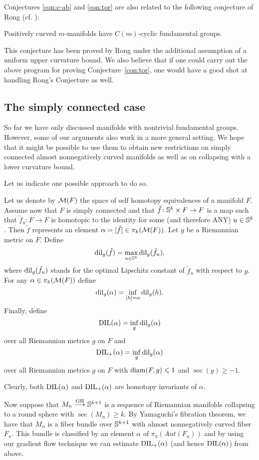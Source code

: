 \documentclass{amsart}
\begin{document}
Conjectures \ref{con:c-ab} and  \ref{con:tor} are also related to the following conjecture of Rong
(cf. \cite{Ro2,Ro1}):

\begin{conj}[Rong] \label{con:rong} Positively curved $m$-manifolds have
$C(m)$-cyclic fundamental groups.
\end{conj}

This conjecture has been proved by Rong \cite{Ro2} under the
additional assumption of a uniform upper curvature bound. We also
believe that if one could carry out the above program for proving
Conjecture~\ref{con:tor}, one would have a good shot at handling
Rong's Conjecture as well.

\subsection{The simply connected case}
So far we have only discussed manifolds with nontrivial fundamental groups.
However, some of our arguments  also work in a more general setting.
We hope that it might be possible  to use them to obtain new restrictions on simply connected almost nonnegatively curved manifolds as well as on collapsing with a lower curvature bound.

Let us indicate one possible approach to do so.

Let us denote by ${\mathcal M}(F)$ the space of self homotopy equivalences of a manifold $F$.
Assume now that $F$ is simply connected and that $\tilde f\colon {\Bbb S}^{k}\times F\to F$ is a map such that $\tilde f_u\colon F\to F$ is homotopic to the identity for some (and therefore ANY) $u\in {\Bbb S}^{k}$.
Then $\tilde f$ represents an element $\alpha=[\tilde f]\in \pi_{k}({\mathcal M}(F))$.
Let $g$ be a Riemannian metric on $F$.
Define
$$\operatorname{\rm dil}_g(\tilde f)=\max_{u\in {\Bbb S}^k}\operatorname{\rm dil}_g(\tilde f_u),$$
where  $\operatorname{\rm dil}_g(\tilde f_u)$ stands for the optimal Lipschitz constant of $\tilde f_u$ with respect to $g$.
For any $\alpha\in \pi_k({\mathcal M}(F))$ define
$$\operatorname{\rm dil}_g(\alpha)=\inf_{[h]=\alpha}\operatorname{\rm dil}_g(h).$$
Finally, define
$$\operatorname{\rm DIL}(\alpha)=\inf_g\operatorname{\rm dil}_g(\alpha)$$
over all Riemannian metrics $g$ on $F$ and
$$\operatorname{\rm DIL}_+(\alpha)=\inf_g\operatorname{\rm dil}_g(\alpha)$$
over all Riemannian metrics $g$ on $F$ with $\operatorname{\rm diam}(F,g)\leqslant 1$ and $\sec(g)\ge -1$.

Clearly, both $\operatorname{\rm DIL}(\alpha)$ and $\operatorname{\rm DIL}_+(\alpha)$ are  homotopy invariants of $\alpha$.



Now suppose that $M_n\GHto {\Bbb S}^{k+1}$ is a sequence of Riemannian manifolds collapsing to a round sphere with $\sec(M_n)\ge k$.
By Yamaguchi's fibration theorem, we have that $M_n$ is a fiber bundle over ${\Bbb S}^{k+1}$ with almost nonnegatively curved fiber $F_n$.
This bundle is classified by an element $\alpha$  of $\pi_k(Aut(F_n))$ and by using our gradient flow technique we can estimate $\operatorname{\rm DIL}_+(\alpha)$ (and hence $\operatorname{\rm DIL}(\alpha)$) from above.
\end{document}
